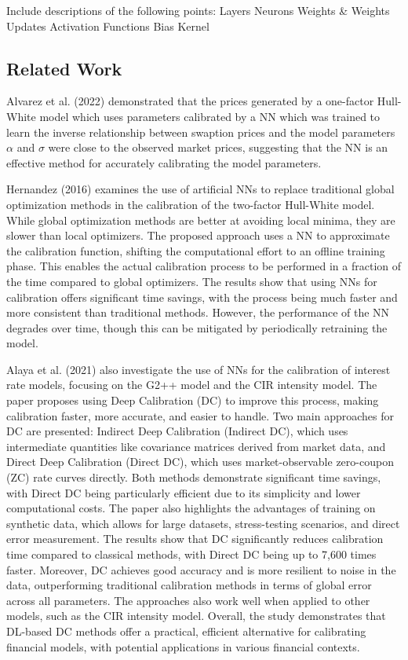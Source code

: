 Include descriptions of the following points:
Layers
Neurons
Weights \& Weights Updates
Activation Functions
Bias
Kernel


\subsection{Related Work}
Alvarez et al. (2022) demonstrated that the prices generated by a one-factor Hull-White model which uses parameters calibrated by a NN which was trained to learn the inverse relationship between swaption prices and the model parameters $\alpha$ and $\sigma$ were close to the observed market prices, suggesting that the NN is an effective method for accurately calibrating the model parameters.

Hernandez (2016) examines the use of artificial NNs to replace traditional global optimization methods in the calibration of the two-factor Hull-White model. While global optimization methods are better at avoiding local minima, they are slower than local optimizers. The proposed approach uses a NN to approximate the calibration function, shifting the computational effort to an offline training phase. This enables the actual calibration process to be performed in a fraction of the time compared to global optimizers. The results show that using NNs for calibration offers significant time savings, with the process being much faster and more consistent than traditional methods. However, the performance of the NN degrades over time, though this can be mitigated by periodically retraining the model.

Alaya et al. (2021) also investigate the use of NNs for the calibration of interest rate models, focusing on the G2++ model and the CIR intensity model. The paper proposes using Deep Calibration (DC) to improve this process, making calibration faster, more accurate, and easier to handle. Two main approaches for DC are presented: Indirect Deep Calibration (Indirect DC), which uses intermediate quantities like covariance matrices derived from market data, and Direct Deep Calibration (Direct DC), which uses market-observable zero-coupon (ZC) rate curves directly. Both methods demonstrate significant time savings, with Direct DC being particularly efficient due to its simplicity and lower computational costs. The paper also highlights the advantages of training on synthetic data, which allows for large datasets, stress-testing scenarios, and direct error measurement. The results show that DC significantly reduces calibration time compared to classical methods, with Direct DC being up to 7,600 times faster. Moreover, DC achieves good accuracy and is more resilient to noise in the data, outperforming traditional calibration methods in terms of global error across all parameters. The approaches also work well when applied to other models, such as the CIR intensity model. Overall, the study demonstrates that DL-based DC methods offer a practical, efficient alternative for calibrating financial models, with potential applications in various financial contexts.


